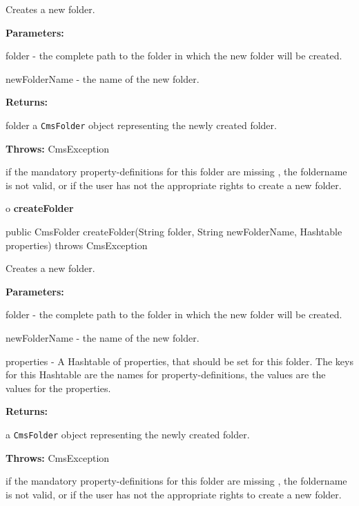 \begin{description}
\htmlDD Creates a new folder. 

\begin{description}
\item {\bf Parameters:}  

folder - the complete path to the folder in which the new folder will be
created.  

newFolderName - the name of the new folder.  
\item {\bf Returns:}  

folder a {\tt CmsFolder} object representing the newly created folder.  
\item {\bf Throws:} CmsException  

if the mandatory property-definitions for this folder are missing , the
foldername is not valid, or if the user has not the appropriate rights to
create a new folder.  
\end{description}

\end{description}

o {\bf createFolder} 

\begin{PRE}
 public CmsFolder createFolder(String folder,
                               String newFolderName,
                               Hashtable properties) throws CmsException
\end{PRE}

\begin{description}
\htmlDD Creates a new folder. 

\begin{description}
\item {\bf Parameters:}  

folder - the complete path to the folder in which the new folder will be
created.  

newFolderName - the name of the new folder.  

properties - A Hashtable of properties, that should be set for this folder.
The keys for this Hashtable are the names for property-definitions, the values
are the values for the properties.  
\item {\bf Returns:}  

a {\tt CmsFolder} object representing the newly created folder.  
\item {\bf Throws:} CmsException  

if the mandatory property-definitions for this folder are missing , the
foldername is not valid, or if the user has not the appropriate rights to
create a new folder.  
\end{description}

\end{description}

